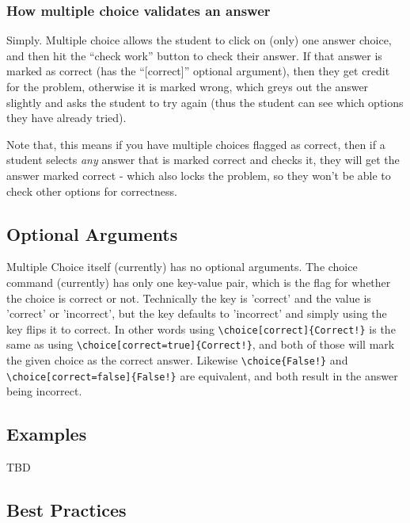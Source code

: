 \documentclass{ximera}
\begin{document}
            
        \subsubsection*{How multiple choice validates an answer}
        
            Simply. Multiple choice allows the student to click on (only) one answer choice, and then hit the ``check work'' button to check their answer. If that answer is marked as correct (has the ``[correct]'' optional argument), then they get credit for the problem, otherwise it is marked wrong, which greys out the answer slightly and asks the student to try again (thus the student can see which options they have already tried).
            
            Note that, this means if you have multiple choices flagged as correct, then if a student selects \textit{any} answer that is marked correct and checks it, they will get the answer marked correct - which also locks the problem, so they won't be able to check other options for correctness.
            
            
    
    \subsection*{Optional Arguments}
    
        Multiple Choice itself (currently) has no optional arguments. The choice command (currently) has only one key-value pair, which is the flag for whether the choice is correct or not. Technically the key is 'correct' and the value is 'correct' or 'incorrect', but the key defaults to 'incorrect' and simply using the key flips it to correct. In other words using \verb|\choice[correct]{Correct!}| is the same as using \verb|\choice[correct=true]{Correct!}|, and both of those will mark the given choice as the correct answer. Likewise \verb|\choice{False!}| and \verb|\choice[correct=false]{False!}| are equivalent, and both result in the answer being incorrect.
        
    \subsection*{Examples}
    
        TBD
        
    \subsection*{Best Practices}
    
\end{document}
